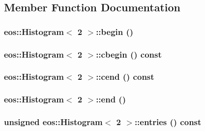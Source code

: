 \subsection{Member Function Documentation}
\hypertarget{classeos_1_1Histogram_3_012_01_4_a707137db436a294fd3b1f04db0932f28}{
\subsubsection[{begin}]{ eos::Histogram$<$ 2 $>$::begin ()}}
\label{classeos_1_1Histogram_3_012_01_4_a707137db436a294fd3b1f04db0932f28}
\hypertarget{classeos_1_1Histogram_3_012_01_4_a39f7bf7af2482f97390aeacbe6073f4c}{
\subsubsection[{cbegin}]{ eos::Histogram$<$ 2 $>$::cbegin () const}}
\label{classeos_1_1Histogram_3_012_01_4_a39f7bf7af2482f97390aeacbe6073f4c}
\hypertarget{classeos_1_1Histogram_3_012_01_4_a0029dc44ba45b97a35c694314db1df14}{
\subsubsection[{cend}]{ eos::Histogram$<$ 2 $>$::cend () const}}
\label{classeos_1_1Histogram_3_012_01_4_a0029dc44ba45b97a35c694314db1df14}
\hypertarget{classeos_1_1Histogram_3_012_01_4_a5a2a5bce976bb53ae5a168c91d5cdef2}{
\subsubsection[{end}]{ eos::Histogram$<$ 2 $>$::end ()}}
\label{classeos_1_1Histogram_3_012_01_4_a5a2a5bce976bb53ae5a168c91d5cdef2}
\hypertarget{classeos_1_1Histogram_3_012_01_4_a34387612b5d49dc13d7ab62c35d6f806}{
\subsubsection[{entries}]{\setlength{\rightskip}{0pt plus 5cm}unsigned eos::Histogram$<$ 2 $>$::entries () const}}
\label{classeos_1_1Histogram_3_012_01_4_a34387612b5d49dc13d7ab62c35d6f806}


